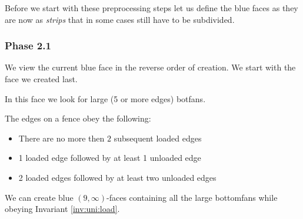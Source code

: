 Before we start with these preprocessing steps let us define the blue faces as they are now as \emph{strips} that in some cases still have to be subdivided.

\subsubsection{Phase 2.1}
We view the current blue face in the reverse order of creation. We start with the face we created last.

In this face we look for large (5 or more edges) botfans.

\begin{invariants}
  \label{inv:uni:load}
  \item The edges on a fence obey the following:
  \begin{itemize}
    \item There are no more then $2$ subsequent loaded edges
    \item 1 loaded edge followed by at least 1 unloaded edge
    \item 2 loaded edges followed by at least two unloaded edges
  \end{itemize}
\end{invariants}


\begin{lemma}
  \label{lm:uni:removingLargeB-fans}
  We can create blue $(9, \infty)$-faces containing all the large bottomfans while obeying Invariant \ref{inv:uni:load}.
\end{lemma}


